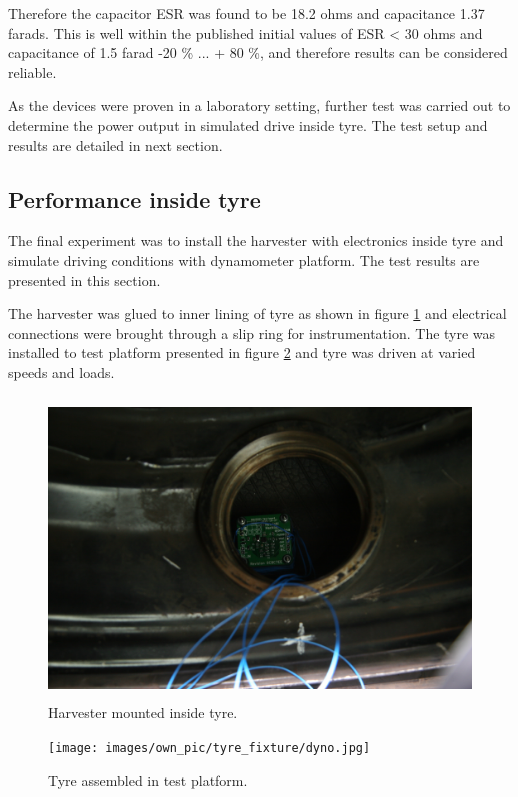 Therefore the capacitor ESR was found to be 18.2 ohms and capacitance 1.37 farads. This is well within the published initial values of ESR < 30 ohms and capacitance of 1.5 farad -20 \% ... + 80 \%, and therefore results can be considered reliable. 

As the devices were proven in a laboratory setting, further test was carried out to determine the power output in simulated drive inside tyre. The test setup and results are detailed in next section.

\subsection{Performance inside tyre}
The final experiment was to install the harvester with electronics inside tyre and simulate driving conditions with dynamometer platform. The test results are presented in this section. 

The harvester was glued to inner lining of tyre as shown in figure \ref{fig:harvester_potted} and electrical connections were brought through a slip ring for instrumentation. The tyre was installed to test platform presented in figure \ref{fig:tyre_platform} and tyre was driven at varied speeds and loads. 

\begin{figure}[htb]
\begin{center}
\includegraphics[height=8cm]{images/own_pic/tyre_fixture/piezo_bq_mount.jpg}
\end{center}
\caption{\label{fig:harvester_potted}Harvester mounted inside tyre.}
\end{figure}

\begin{figure}[htb]
\begin{center}
\texttt{[image: images/own\_pic/tyre\_fixture/dyno.jpg]}
\end{center}
\caption{\label{fig:tyre_platform} Tyre assembled in test platform.}
\end{figure}

